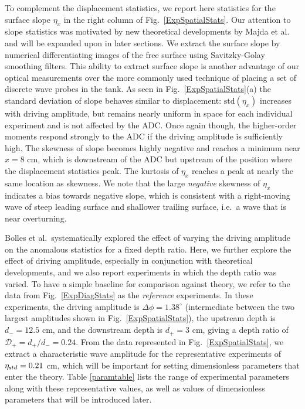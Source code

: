 \documentclass[11pt]{article}
\newcommand{\etastd}{\eta_{\text std}}
\newcommand{\depth}{d}
\newcommand{\dup}{\depth_{-}}
\newcommand{\ddn}{\depth_{+}}
\newcommand{\drat}{\mathcal{D}}
\newcommand{\dratdn}{\drat_+}
\newcommand{\Dphi}{\Delta \phi}
\newcommand{\std}{\text{std}}
\begin{document}
	To complement the displacement statistics, we report here statistics for the surface slope $\eta_x$ in the right column of Fig.~\ref{ExpSpatialStats}. Our attention to slope statistics was motivated by new theoretical developments by Majda et al.~\cite{majda2019} and will be expanded upon in later sections. We extract the surface slope by numerical differentiating images of the free surface using Savitzky-Golay smoothing filters. This ability to extract surface slope is another advantage of our optical measurements over the more commonly used technique of placing a set of discrete wave probes in the tank. As seen in Fig.~\ref{ExpSpatialStats}(a) the standard deviation of slope behaves similar to displacement: $\std(\eta_x)$ increases with driving amplitude, but remains nearly uniform in space for each individual experiment and is not affected by the ADC. Once again though, the higher-order moments respond strongly to the ADC if the driving amplitude is sufficiently high. The skewness of slope becomes highly negative and reaches a minimum near $x = 8$ cm, which is downstream of the ADC but upstream of the position where the displacement statistics peak. The kurtosis of $\eta_x$ reaches a peak at nearly the same location as skewness. We note that the large {\em negative} skewness of $\eta_x$ indicates a bias towards negative slope, which is consistent with a right-moving wave of steep leading surface and shallower trailing surface, i.e.~a wave that is near overturning.

	Bolles et al.~systematically explored the effect of varying the driving amplitude on the anomalous statistics for a fixed depth ratio. 
Here, we further explore the effect of driving amplitude, especially in conjunction with theoretical developments, and we also report experiments in which the depth ratio was varied. 
To have a simple baseline for comparison against theory, we refer to the data from Fig.~\ref{ExpDiagStats} as the {\em reference} experiments. In these experiments, the driving amplitude is $\Dphi = 1.38^{\circ}$ (intermediate between the two largest amplitudes shown in Fig.~\ref{ExpSpatialStats}), the upstream depth is $\dup = 12.5$ cm, and the downstream depth is $\ddn = 3$ cm, giving a depth ratio of $\dratdn = \ddn/\dup= 0.24$. From the data represented in Fig.~\ref{ExpSpatialStats}, we extract a characteristic wave amplitude for the representative experiments of $\etastd = 0.21$ cm, which will be important for setting dimensionless parameters that enter the theory. Table \ref{paramtable} lists the range of experimental parameters along with these representative values, as well as values of dimensionless parameters that will be introduced later.
\end{document}
